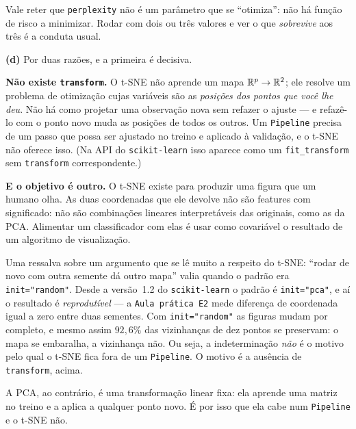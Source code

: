 \documentclass[11pt,a4paper]{article}
\begin{document}
\begin{solucao}
Vale reter que \texttt{perplexity} não é um parâmetro que se ``otimiza'': não há
função de risco a minimizar. Rodar com dois ou três valores e ver o que
\emph{sobrevive} aos três é a conduta usual.

\smallskip
\textbf{(d)} Por duas razões, e a primeira é decisiva.

\textbf{Não existe \texttt{transform}.} O t-SNE não aprende um mapa
$\mathbb{R}^p\to\mathbb{R}^2$; ele resolve um problema de otimização cujas variáveis são as
\emph{posições dos pontos que você lhe deu}. Não há como projetar uma observação
nova sem refazer o ajuste --- e refazê-lo com o ponto novo muda as posições de
todos os outros. Um \texttt{Pipeline} precisa de um passo que possa ser ajustado no
treino e aplicado à validação, e o t-SNE não oferece isso. (Na API do
\texttt{scikit-learn} isso aparece como um \texttt{fit\_transform} sem
\texttt{transform} correspondente.)

\textbf{E o objetivo é outro.} O t-SNE existe para produzir uma figura que um
humano olha. As duas coordenadas que ele devolve não são features com significado:
não são combinações lineares interpretáveis das originais, como as da PCA.
Alimentar um classificador com elas é usar como covariável o resultado de um
algoritmo de visualização.

Uma ressalva sobre um argumento que se lê muito a respeito do t-SNE: ``rodar de
novo com outra semente dá outro mapa'' valia quando o padrão era
\texttt{init="random"}. Desde a versão~1.2 do \texttt{scikit-learn} o padrão é
\texttt{init="pca"}, e aí o resultado é \emph{reprodutível} --- a \texttt{Aula
prática E2} mede diferença de coordenada igual a zero entre duas sementes. Com
\texttt{init="random"} as figuras mudam por completo, e mesmo assim $92{,}6\%$ das
vizinhanças de dez pontos se preservam: o mapa se embaralha, a vizinhança não.
Ou seja, a indeterminação \emph{não} é o motivo pelo qual o t-SNE fica fora de um
\texttt{Pipeline}. O motivo é a ausência de \texttt{transform}, acima.

A PCA, ao contrário, é uma transformação linear fixa: ela aprende uma matriz no
treino e a aplica a qualquer ponto novo. É por isso que ela cabe num
\texttt{Pipeline} e o t-SNE não.
\end{solucao}
\end{document}
